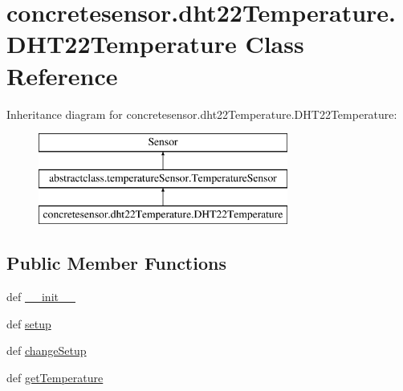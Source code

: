 \hypertarget{classconcretesensor_1_1dht22Temperature_1_1DHT22Temperature}{}\section{concretesensor.\+dht22\+Temperature.\+D\+H\+T22\+Temperature Class Reference}
\label{classconcretesensor_1_1dht22Temperature_1_1DHT22Temperature}
Inheritance diagram for concretesensor.\+dht22\+Temperature.\+D\+H\+T22\+Temperature\+:\begin{figure}[H]
\begin{center}
\leavevmode
\includegraphics[height=3.000000cm]{classconcretesensor_1_1dht22Temperature_1_1DHT22Temperature}
\end{center}
\end{figure}
\subsection*{Public Member Functions}
\begin{DoxyCompactItemize}
\item 
def \hyperlink{classconcretesensor_1_1dht22Temperature_1_1DHT22Temperature_acc92361fe58e119c0918e20108aecfa0}{\+\_\+\+\_\+init\+\_\+\+\_\+}
\item 
def \hyperlink{classconcretesensor_1_1dht22Temperature_1_1DHT22Temperature_a8945732a3971707806f406012add126e}{setup}
\item 
def \hyperlink{classconcretesensor_1_1dht22Temperature_1_1DHT22Temperature_a7c5d503a11750b44c79ca10d559c9955}{change\+Setup}
\item 
def \hyperlink{classconcretesensor_1_1dht22Temperature_1_1DHT22Temperature_acbef72b0bba8bcce0159850f19b74a92}{get\+Temperature}
\end{DoxyCompactItemize}
